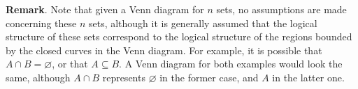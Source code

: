 \documentclass[12pt]{article}
\begin{document}
\textbf{Remark}.  Note that given a Venn diagram for $n$ sets, no assumptions are made concerning these $n$ sets, although it is generally assumed that the logical structure of these sets correspond to the logical structure of the regions bounded by the closed curves in the Venn diagram.  For example, it is possible that $A\cap B=\varnothing$, or that $A\subseteq B$.  A Venn diagram for both examples would look the same, although $A\cap B$ represents $\varnothing$ in the former case, and $A$ in the latter one.
\end{document}
